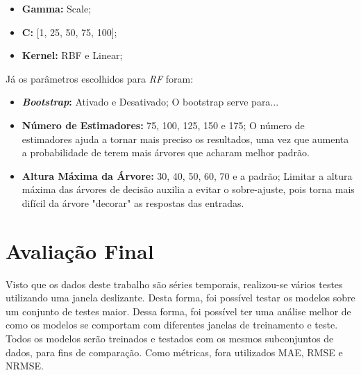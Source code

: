 \begin{itemize}
    \item \textbf{Gamma:} Scale;
    \item \textbf{C:} [1, 25, 50, 75, 100];
    \item \textbf{Kernel:} RBF e Linear;
\end{itemize}

Já os parâmetros escolhidos para \textit{\acrshort{RF}} foram:

\begin{itemize}
    \item \textbf{\textit{Bootstrap}:} Ativado e Desativado;
    O bootstrap serve para...
    \item \textbf{Número de Estimadores:} 75, 100, 125, 150 e 175;
    O número de estimadores ajuda a tornar mais preciso os resultados, uma vez que aumenta a probabilidade de terem mais árvores que acharam melhor padrão.
    \item \textbf{Altura Máxima da Árvore:} 30, 40, 50, 60, 70 e a padrão;
    Limitar a altura máxima das árvores de decisão auxilia a evitar o sobre-ajuste, pois torna mais difícil da árvore "decorar" as respostas das entradas.
    
    
\end{itemize}

\section{Avaliação Final}




Visto que os dados deste trabalho são séries temporais, realizou-se vários testes utilizando uma janela deslizante. Desta forma, foi possível testar os modelos sobre um conjunto de testes maior. Dessa forma, foi possível ter uma análise melhor de como os modelos se comportam com diferentes janelas de treinamento e teste. Todos os modelos serão treinados e testados com os mesmos subconjuntos de dados, para fins de comparação. Como métricas, fora utilizados \acrshort{MAE}, \acrshort{RMSE} e \acrshort{NRMSE}. 


